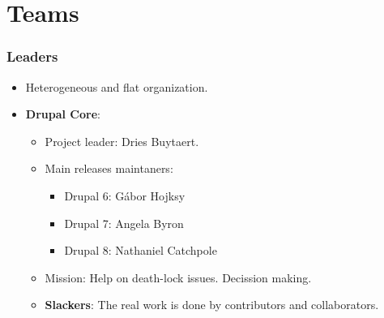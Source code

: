 \section{Teams}

\begin{frame}[allowframebreaks]
\frametitle{Leaders}
\begin{itemize}
\item Heterogeneous and flat organization.
\item \textbf{Drupal Core}: 
\begin{itemize}
\item {Project leader}: Dries Buytaert.
\item {Main releases maintaners}: 
\begin{itemize}
\item {Drupal 6}: G\'abor Hojksy
\item {Drupal 7}: Angela Byron
\item {Drupal 8}: Nathaniel Catchpole
\end{itemize}
\item {Mission}: Help on death-lock issues. Decission making.
\item {\textbf{Slackers}}: The real work is done by contributors and collaborators.
\end{itemize}
\end{itemize}
\end{frame}
